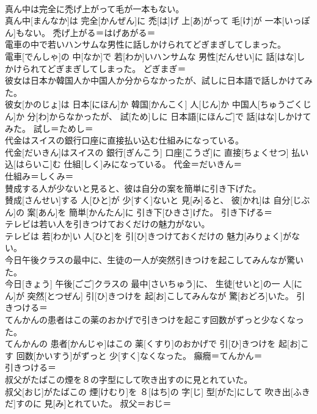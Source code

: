 \documentclass[8pt]{extreport}
\begin{document}
\begin{CJK}{UTF8}{min}
\\	真ん中は完全に禿げ上がって毛が一本もない。	
\\	真ん中[まんなか]は 完全[かんぜん]に 禿[は]げ 上[あ]がって 毛[け]が 一本[いっぽん]もない。	禿げ上がる＝はげあがる＝ 
\\	電車の中で若いハンサムな男性に話しかけられてどぎまぎしてしまった。	
\\	電車[でんしゃ]の 中[なか]で 若[わか]いハンサムな 男性[だんせい]に 話[はな]しかけられてどぎまぎしてしまった。	どぎまぎ＝ 
\\	彼女は日本か韓国人か中国人か分からなかったが、試しに日本語で話しかけてみた。	
\\	彼女[かのじょ]は 日本[にほん]か 韓国[かんこく] 人[じん]か 中国人[ちゅうごくじん]か 分[わ]からなかったが、 試[ため]しに 日本語[にほんご]で 話[はな]しかけてみた。	試し＝ためし＝ 
\\	代金はスイスの銀行口座に直接払い込む仕組みになっている。	
\\	代金[だいきん]はスイスの 銀行[ぎんこう] 口座[こうざ]に 直接[ちょくせつ] 払い込[はらいこ]む 仕組[しく]みになっている。	代金＝だいきん＝ 
\\	仕組み＝しくみ＝ 
\\	賛成する人が少ないと見ると、彼は自分の案を簡単に引き下げた。	
\\	賛成[さんせい]する 人[ひと]が 少[すく]ないと 見[み]ると、 彼[かれ]は 自分[じぶん]の 案[あん]を 簡単[かんたん]に 引き下[ひきさ]げた。	引き下げる＝ 
\\	テレビは若い人を引きつけておくだけの魅力がない。	
\\	テレビは 若[わか]い 人[ひと]を 引[ひ]きつけておくだけの 魅力[みりょく]がない。	
\\	今日午後クラスの最中に、生徒の一人が突然引きつけを起こしてみんなが驚いた。	
\\	今日[きょう] 午後[ごご]クラスの 最中[さいちゅう]に、 生徒[せいと]の一 人[にん]が 突然[とつぜん] 引[ひ]きつけを 起[お]こしてみんなが 驚[おどろ]いた。	引きつける＝ 
\\	てんかんの患者はこの薬のおかげで引きつけを起こす回数がずっと少なくなった。	
\\	てんかんの 患者[かんじゃ]はこの 薬[くすり]のおかげで 引[ひ]きつけを 起[お]こす 回数[かいすう]がずっと 少[すく]なくなった。	癲癇＝てんかん＝ 
\\	引きつける＝ 
\\	叔父がたばこの煙を８の字型にして吹き出すのに見とれていた。	
\\	叔父[おじ]がたばこの 煙[けむり]を ８[はち]の 字[じ] 型[がた]にして 吹き出[ふきだ]すのに 見[み]とれていた。	叔父＝おじ＝ 

\end{CJK}
\end{document}
